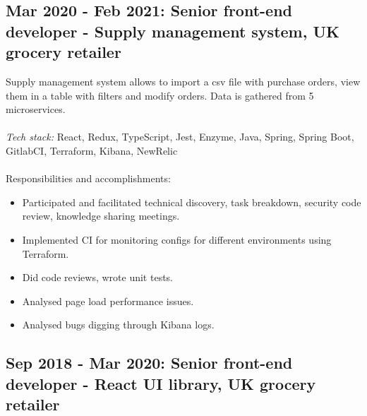 \documentclass[a4paper, 14pt]{article}
\begin{document}
  \subsection{Mar 2020 - Feb 2021: Senior front-end developer - Supply management system, UK grocery retailer}
  Supply management system allows to import a csv file with purchase orders, view them in a table with filters and modify orders. Data is gathered from 5 microservices. \\
  \\
  \textit{Tech stack:} React, Redux, TypeScript, Jest, Enzyme, Java, Spring, Spring Boot, GitlabCI, Terraform, Kibana, NewRelic \\
  \\
  Responsibilities and accomplishments:
    \begin{itemize}
      \item Participated and facilitated technical discovery, task breakdown, security code review, knowledge sharing meetings. \\
      \item Implemented CI for monitoring configs for different environments using Terraform. \\
      \item Did code reviews, wrote unit tests. \\
      \item Analysed page load performance issues. \\
      \item Analysed bugs digging through Kibana logs. \\
    \end{itemize}

  \subsection{Sep 2018 - Mar 2020: Senior front-end developer - React UI library, UK grocery retailer}
\end{document}
